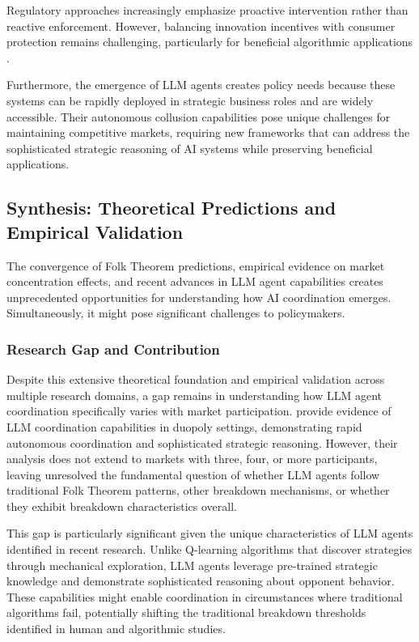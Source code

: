 Regulatory approaches increasingly emphasize proactive intervention rather than reactive enforcement. However, balancing innovation incentives with consumer protection remains challenging, particularly for beneficial algorithmic applications \parencite{digital_regulation_cooperation_forum_auditing_2022}.

Furthermore, the emergence of LLM agents creates policy needs because these systems can be rapidly deployed in strategic business roles and are widely accessible. Their autonomous collusion capabilities pose unique challenges for maintaining competitive markets, requiring new frameworks that can address the sophisticated strategic reasoning of AI systems while preserving beneficial applications.

\subsection{Synthesis: Theoretical Predictions and Empirical Validation}

The convergence of Folk Theorem predictions, empirical evidence on market concentration effects, and recent advances in LLM agent capabilities creates unprecedented opportunities for understanding how AI coordination emerges. Simultaneously, it might pose significant challenges to policymakers.

\subsubsection*{Research Gap and Contribution}

Despite this extensive theoretical foundation and empirical validation across multiple research domains, a gap remains in understanding how LLM agent coordination specifically varies with market participation. \textcite{fish_algorithmic_2025, lin_strategic_2025} provide evidence of LLM coordination capabilities in duopoly settings, demonstrating rapid autonomous coordination and sophisticated strategic reasoning. However, their analysis does not extend to markets with three, four, or more participants, leaving unresolved the fundamental question of whether LLM agents follow traditional Folk Theorem patterns, other breakdown mechanisms, or whether they exhibit breakdown characteristics overall.

This gap is particularly significant given the unique characteristics of LLM agents identified in recent research. Unlike Q-learning algorithms that discover strategies through mechanical exploration, LLM agents leverage pre-trained strategic knowledge and demonstrate sophisticated reasoning about opponent behavior. These capabilities might enable coordination in circumstances where traditional algorithms fail, potentially shifting the traditional breakdown thresholds identified in human and algorithmic studies.

